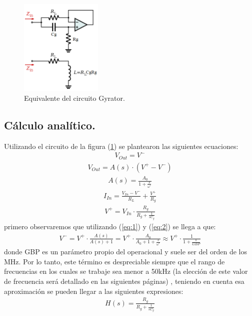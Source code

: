\begin{figure}[H]	
	\centering
	\includegraphics[width=0.35\textwidth]{ImagenesEj2/gyrop.png}
	\caption{Equivalente del circuito Gyrator.}
	\label{fig:gyrop}
\end{figure}

\subsection{Cálculo analítico.}
Utilizando el circuito de la figura (\ref{fig:gyrop}) se plantearon las siguientes ecuaciones:
\begin{align}   V_{Out} = V^- \label{eq:1}\end{align}
\begin{align} V_{Out} = A(s) \cdot (V^+-V^-)\label{eq:2}\end{align}
\begin{align} A(s)= \frac{A_0}{1+\frac{s}{\omega'}}\end{align}
\begin{align} I_{In}=\frac{V_{In}-V^-}{R_L}+\frac{V^+}{R_g}\end{align}
\begin{align} V^+=V_{In}\cdot \frac{R_g}{R_g+\frac{1}{sC_g}} \end{align}
primero observaremos que utilizando (\ref{eq:1}) y (\ref{eq:2}) se llega a que:
\begin{align}V^- =V^+ \cdot \frac{A(s)}{A(s)+1} = V^+ \cdot \frac{A_0}{A_0+1+\frac{s}{\omega'}} \approx V^+ \cdot \frac{1}{1+\frac{s}{GBP}} \label{eq:desp}   \end{align}
donde GBP es un parámetro propio del operacional y suele ser del orden de los MHz. Por lo tanto, este término es despreciable siempre que el rango de frecuencias en los cuales se trabaje sea menor a 50kHz (la elección de este valor de frecuencia será detallado en las siguientes páginas)
, teniendo en cuenta esa aproximación se pueden llegar a las siguientes expresiones:
\begin{align}H(s)= \frac{R_g}{R_g+\frac{1}{sC_g}} \end{align}


